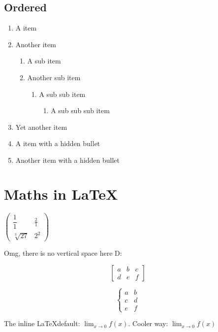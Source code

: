\documentclass[a4paper,12pt]{article}
\begin{document}
\subsection{Ordered}
\begin{enumerate}
    \item A item
    \item Another item
    \begin{enumerate}
        \item A sub item
        \item Another sub item
        \begin{enumerate}
            \item A sub sub item
            \begin{enumerate}
                \item A sub sub sub item
            \end{enumerate}
        \end{enumerate}
    \end{enumerate}
    \item Yet another item
    \item [] A item with a hidden bullet
    \item[] Another item with a hidden bullet
\end{enumerate}

\section{Maths in \LaTeX}
$
\left( \begin{array}{cc}
    \dfrac{1}{1} & \frac{2}{1} \\
    \sqrt[3]{27} & 2^2
\end{array} \right)
$

Omg, there is no vertical space here D:

$$
\left[ \begin{array}{ccc}
    a & b & c \\
    d & e & f
\end{array} \right]
$$

\begin{equation}
\left\{ \begin{array}{ccc}
    a & b \\
    c & d \\
    e & f
\end{array} \right.
\end{equation}

The inline \LaTeX default: $\lim_{x \rightarrow 0} f(x)$. Cooler way: $\displaystyle \lim_{x\rightarrow0} f(x)$
\end{document}
